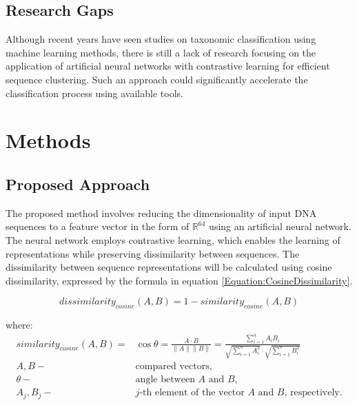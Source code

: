 \documentclass[pdflatex,sn-vancouver-num]{sn-jnl}%
\begin{document}
            \subsection{Research Gaps}
                Although recent years have seen studies on taxonomic classification using machine learning methods, there is still a lack of research focusing on the application of artificial neural networks with contrastive learning for efficient sequence clustering. Such an approach could significantly accelerate the classification process using available tools.

    \section{Methods}

        \subsection{Proposed Approach}
            The proposed method involves reducing the dimensionality of input DNA sequences to a feature vector in the form of $\mathbb{R}^{64}$ using an artificial neural network. The neural network employs contrastive learning, which enables the learning of representations while preserving dissimilarity between sequences. The dissimilarity between sequence representations will be calculated using cosine dissimilarity, expressed by the formula in equation \eqref{Equation:CosineDissimilarity}.

            \begin{equation}
                dissimilarity_{cosine}(A, B) = 1 - similarity_{cosine}(A, B)
                \label{Equation:CosineDissimilarity}
            \end{equation}

            where:
            \begin{align*}
                similarity_{cosine}(A, B) =& \cos{\theta} = \frac{A \cdot B}{\|A\| \|B\|} = \frac{
                    \sum^{n}_{i = 1}A_i B_i
                }{
                    \sqrt{
                        \sum^{n}_{i = 1}A_i^2
                    }
                    \cdot
                    \sqrt{
                        \sum^{n}_{i = 1}B_i^2
                    }
                } \\
                A, B -& \text{compared vectors,} \\
                \theta -& \text{angle between $A$ and $B$,} \\
                A_j, B_j -& \text{$j$-th element of the vector $A$ and $B$, respectively.}
            \end{align*}
\end{document}
